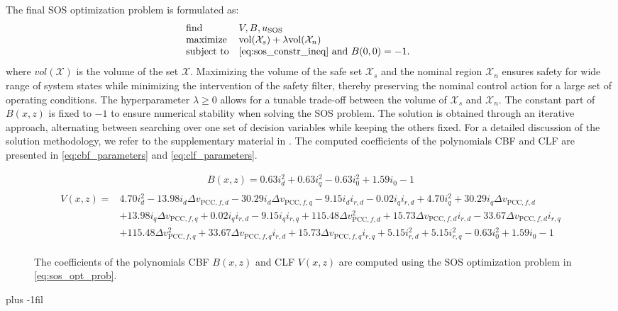 \documentclass[lettersize,journal]{IEEEtran}
\begin{document}
The final SOS optimization problem is formulated as:
\begin{align} \label{eq:sos_opt_prob}
   \hspace{-\leftmargin}
   \begin{array}{ll}
      \mbox{find} & V, B, u_\mathrm{SOS} \\
      \mbox{maximize} & \text{vol}(\mathcal X_s) + \lambda \text{vol}(\mathcal X_n) \\
      \mbox{subject to} & \text{\cref{eq:sos_constr_ineq}} \text{ and } B(0, 0) = -1.
   \end{array}
\end{align}
where $vol(\mathcal X)$ is the volume of the set $\mathcal X$.
Maximizing the volume of the safe set $\mathcal X_s$ and the nominal region $\mathcal X_n$ ensures safety for wide range of system states while minimizing the intervention of the safety filter, thereby preserving the nominal control action for a large set of operating conditions.
The hyperparameter $\lambda \geq 0$ allows for a tunable trade-off between the volume of $\mathcal X_s$ and $\mathcal X_n$.
The constant part of $B(x,z)$ is fixed to $-1$ to ensure numerical stability when solving the SOS problem.
The solution is obtained through an iterative approach, alternating between searching over one set of decision variables while keeping the others fixed.
For a detailed discussion of the solution methodology, we refer to the supplementary material in \cite{schneeberger2024advanced}.
The computed coefficients of the polynomials CBF and CLF are presented in \cref{eq:cbf_parameters} and \cref{eq:clf_parameters}.


\begin{figure}[ht]
   \normalsize
   \begin{align} \label{eq:cbf_parameters}
      B(x, z) =  0.63 i_d^2 + 0.63 i_q^2 - 0.63 i_0^2 + 1.59 i_0 - 1
   \end{align}
   \begin{align} \label{eq:clf_parameters}
      \begin{split}
      V(x, z) = 
      &4.70 i_d^2 
      - 13.98 i_d \Delta v_{\text{PCC},f,d} 
      - 30.29 i_d \Delta v_{\text{PCC},f,q} 
      - 9.15 i_d i_{r,d}
      - 0.02 i_q i_{r,d}
      + 4.70 i_q^2 
      + 30.29 i_q \Delta v_{\text{PCC},f,d} \\
      &+ 13.98 i_q \Delta v_{\text{PCC},f,q}
      + 0.02 i_q i_{r,d}
      - 9.15 i_q i_{r,q}
      + 115.48 \Delta v_{\text{PCC},f,d}^2
      + 15.73 \Delta v_{\text{PCC},f,d} i_{r,d}
      - 33.67 \Delta v_{\text{PCC},f,d} i_{r,q} \\
      &+ 115.48 \Delta v_{\text{PCC},f,q}^2
      + 33.67 \Delta v_{\text{PCC},f,q} i_{r,d}
      + 15.73 \Delta v_{\text{PCC},f,q} i_{r,q}
      + 5.15 i_{r,d}^2
      + 5.15 i_{r,q}^2
      - 0.63 i_0^2 
      + 1.59 i_0 
      - 1
      \end{split}
   \end{align}
   \hrulefill %
   \caption{The coefficients of the polynomials CBF $B(x, z)$ and CLF $V(x, z)$ are computed using the SOS optimization problem in \cref{eq:sos_opt_prob}.}
\end{figure}




\baselineskip plus -1fil
\end{document}
